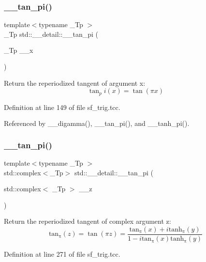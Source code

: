 \subsubsection{\texorpdfstring{\+\_\+\+\_\+tan\+\_\+pi()}{\_\_tan\_pi()}\hspace{0.1cm}{\footnotesize\ttfamily [1/2]}}
{\footnotesize\ttfamily template$<$typename \+\_\+\+Tp $>$ \\
\+\_\+\+Tp std\+::\+\_\+\+\_\+detail\+::\+\_\+\+\_\+tan\+\_\+pi (\begin{DoxyParamCaption}\item[{\+\_\+\+Tp}]{\+\_\+\+\_\+x }\end{DoxyParamCaption})}

Return the reperiodized tangent of argument x\+: \[ \tan_pi(x) = \tan(\pi x) \] 

Definition at line 149 of file sf\+\_\+trig.\+tcc.



Referenced by \+\_\+\+\_\+digamma(), \+\_\+\+\_\+tan\+\_\+pi(), and \+\_\+\+\_\+tanh\+\_\+pi().

\mbox{\label{namespacestd_1_1____detail_ae19d579db4245c9c4e53a70a0513bb00}} 
\subsubsection{\texorpdfstring{\+\_\+\+\_\+tan\+\_\+pi()}{\_\_tan\_pi()}\hspace{0.1cm}{\footnotesize\ttfamily [2/2]}}
{\footnotesize\ttfamily template$<$typename \+\_\+\+Tp $>$ \\
std\+::complex$<$\+\_\+\+Tp$>$ std\+::\+\_\+\+\_\+detail\+::\+\_\+\+\_\+tan\+\_\+pi (\begin{DoxyParamCaption}\item[{std\+::complex$<$ \+\_\+\+Tp $>$}]{\+\_\+\+\_\+z }\end{DoxyParamCaption})}

Return the reperiodized tangent of complex argument z\+: \[ \mathrm{tan_\pi}(z) = \tan(\pi z) = \frac{\mathrm{tan_\pi}(x) + i \mathrm{tanh_\pi}(y)} {1 - i \mathrm{tan_\pi}(x) \mathrm{tanh_\pi}(y)} \] 

Definition at line 271 of file sf\+\_\+trig.\+tcc.



